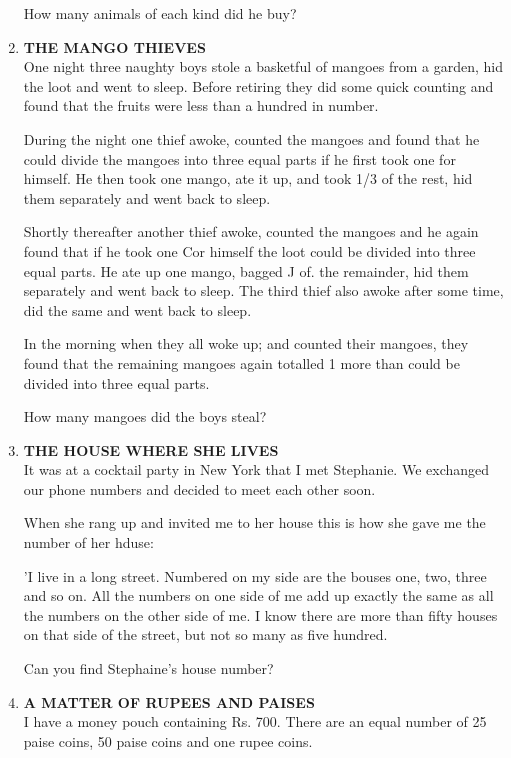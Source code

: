 \documentclass[12pt]{article}
\begin{document}
\begin{enumerate}
How  many  animals  of each  kind  did he buy?

 

\item \textbf{THE  MANGO  THIEVES} \\
One night  three  naughty  boys  stole  a basketful  of mangoes  from  a garden,  hid the  loot  and  went  to sleep. Before  retiring  they  did some  quick  counting  and  found that the fruits  were  less than  a hundred  in number. 

During  the  night  one  thief  awoke,  counted  the mangoes  and found  that  he could  divide  the mangoes  into three  equal  parts  if he first  took  one  for himself.  He  then took  one  mango,  ate it up, and  took  1/3 of the  rest,  hid them  separately  and  went  back  to sleep.

Shortly  thereafter  another  thief  awoke,  counted  the mangoes  and he again  found  that  if he took  one  Cor himself  the loot  could  be divided  into  three  equal  parts. He ate up one mango,  bagged  J of.  the remainder,  hid them  separately  and  went  back  to sleep.  The  third  thief also awoke  after  some  time,  did the same  and  went  back to sleep. 

In the morning  when  they  all woke  up;  and  counted their  mangoes,  they  found  that  the  remaining  mangoes again  totalled  1 more  than  could  be divided  into  three equal  parts. 

How  many  mangoes  did the boys  steal?


\item \textbf{THE  HOUSE  WHERE  SHE  LIVES} \\ 
It was  at a cocktail  party  in New  York  that  I met Stephanie.  We  exchanged  our  phone  numbers  and decided  to meet  each  other  soon. 

When  she rang  up and invited  me to her house  this  is how she gave  me the number  of her hduse: 

'I live in a long  street.  Numbered  on my  side  are the bouses  one,  two,  three  and  so on.  All  the numbers on one side  of me add  up exactly  the  same  as all the numbers  on the other  side  of me. I know  there  are more than fifty  houses  on that  side  of the  street,  but  not  so many  as five  hundred. 

Can you find  Stephaine's  house  number? 


\item \textbf{A MATTER  OF RUPEES  AND  PAISES} \\
I have  a money  pouch  containing  Rs.  700.  There are an equal  number  of 25 paise  coins,  50 paise  coins and one rupee  coins. 


\end{enumerate}
\end{document}

